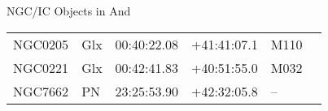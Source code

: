 \begin{block}{NGC/IC Objects in And}
  \centering
  \begin{tabularx}{\textwidth}{llrrll} \toprule 
    NGC0205 & Glx & 00:40:22.08 & +41:41:07.1  & M110 \\ 
    NGC0221 & Glx & 00:42:41.83 & +40:51:55.0  & M032 \\ 
    NGC7662 & PN & 23:25:53.90 & +42:32:05.8  & -- \\ 
  \end{tabularx}
\end{block}